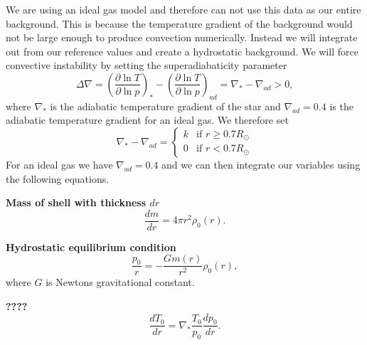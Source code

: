 We are using an ideal gas model and therefore can not use this data as our entire background. This is because the temperature gradient of the background would not be large enough to produce convection numerically. Instead we will integrate out from our reference values and create a hydrostatic background. We will force convective instability by setting the superadiabaticity parameter 
    \begin{equation*}
        \Delta\nabla = \left(\frac{\partial\ln T}{\partial\ln p} \right)_{*} - \left(\frac{\partial\ln T}{\partial\ln p} \right)_{ad} = \nabla_{*} -\nabla_{ad} > 0,
    \end{equation*}
where $\nabla_{*}$ is the adiabatic temperature gradient of the star and $\nabla_{ad}=0.4$ is the adiabatic temperature gradient for an ideal gas. We therefore set 
    \begin{equation*}
    \nabla_{*} -\nabla_{ad} = 
        \begin{cases} 
        k & \text{if } r \geq 0.7 R_{\odot} \\
        0 & \text{if } r < 0.7 R_{\odot}
        \end{cases}
    \end{equation*}
For an ideal gas we have $\nabla_{ad}=0.4$ and we can then integrate our variables using the following equations.

\textbf{Mass of shell with thickness $dr$}
\begin{equation}\label{eq:mass_shell}
    \frac{dm}{dr} = 4\pi r^2\rho_0(r).
\end{equation}

\textbf{Hydrostatic equilibrium condition}
    \begin{equation}\label{eq:hydrostatic_equilibrium}
        \frac{ p_0}{ r} = -\frac{G m(r)}{r^2}\rho_0(r),
    \end{equation}
where $G$ is Newtons gravitational constant.

\textbf{????}
    \begin{equation}\label{eq:dT_dr}
        \frac{d T_0}{d r} = \nabla_{*} \frac{T_0}{p_0}\frac{d p_0}{d r}. 
    \end{equation}

